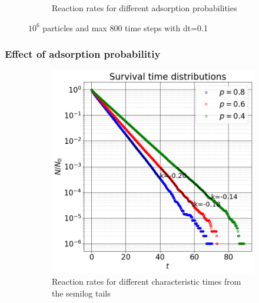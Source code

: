 \documentclass{article}
\begin{document}
\begin{figure}[htbp]
\begin{subfigure}[b]{0.48\textwidth}
        \caption{Reaction rates for different adsorption probabilities}
    \end{subfigure}
    \caption{$10^6$ particles and max 800 time steps with dt=0.1}
    \label{fig:reactionRatesDiffTau}
\end{figure}

\subsubsection{Effect of adsorption probabilitiy}
\begin{figure}[htbp]
    \centering
    \begin{subfigure}[b]{0.48\textwidth}
        \centering
        \includegraphics[width=\textwidth]{images/survTimeDistSemilogProb.png}
        \caption{Reaction rates for different characteristic times from the semilog tails}
    \end{subfigure}
    \hfill
    \begin{subfigure}[b]{0.48\textwidth}
        \centering

\end{subfigure}
\end{figure}
\end{document}
